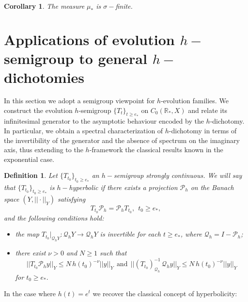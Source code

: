 \documentclass[10pt]{amsart}
\newtheorem{definition}{Definition}
\newtheorem{corollary}{Corollary}
\numberwithin{equation}{section}
\begin{document}
\begin{corollary}
 The measure $\mu_*$  is $\sigma-$finite.  
\end{corollary}


\section{Applications of evolution $h-$semigroup to general $h-$dichotomies}

In this section we adopt a semigroup viewpoint for $h$-evolution families. We construct
the evolution $h$-semigroup $\{T_t\}_{t\ge e_*}$ on $C_0(\mathbb{R}_*,X)$ and relate its
infinitesimal generator to the asymptotic behaviour encoded by the $h$-dichotomy.
In particular, we obtain a spectral characterization of $h$-dichotomy in terms of the
invertibility of the generator and the absence of spectrum on the imaginary axis, thus
extending to the $h$-framework the classical results known in the exponential case.


\begin{definition}
 Let $\{T_{t_0}\}_{t_0 \ge e_*}$ an $h-$semigroup strongly continuous. We will say that $\{T_{t_0}\}_{t_0 \ge e_*}$ is $h-$hyperbolic if there exists a projection $\mathcal{P}_h$ on the Banach space $(Y,||\cdot||_{Y})$ satisfying 
 $$
 T_{t_0} \mathcal{P}_h = \mathcal{P}_hT_{t_0}, \ \ t_0 \ge e_{*}, 
 $$
 and the following conditions hold:
\begin{itemize}
    \item the map $T_{t_0}|_{\mathcal{Q}_hY}: \mathcal{Q}_hY \to \mathcal{Q}_hY$ is invertible for each $t \ge e_*$, where $\mathcal{Q}_h = I - \mathcal{P}_h$;

    \item there exist $\nu > 0$ and $N \ge 1$ such that 
    $$
    ||T_{t_0} \mathcal{P}_hy||_Y \le N \, h(t_0)^{-\nu} ||y||_{Y} \ \ \mbox{and} \ \ ||(T_{t_0})^{-1}_{\mathcal{Q}_h} \,  \mathcal{Q}_hy||_Y \le N \, h(t_0)^{-\nu} ||y||_{Y}    $$
    \noindent for $t_0 \ge e_*.$
\end{itemize}

\end{definition}

In the case where $h(t) = e^t$ we recover 
the classical concept of hyperbolicity: 
\end{document}
